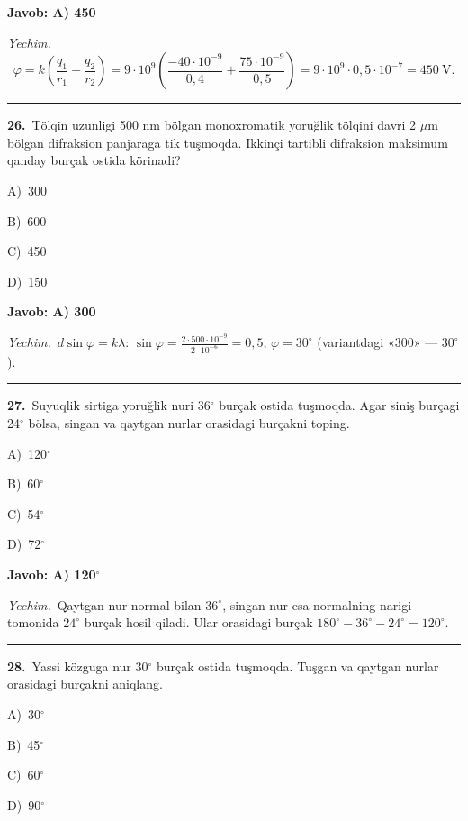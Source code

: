 \documentclass[11pt,a4paper]{article}
\newcommand{\opt}[2]{\hspace*{4mm}#1)\ #2\par}
\begin{document}
\noindent\colorbox{gray!12}{\parbox{\dimexpr\linewidth-2\fboxsep}{\textbf{Javob: A) 450}}}\par\smallskip
\noindent\textit{Yechim.}\ \[\varphi=k\left(\frac{q_1}{r_1}+\frac{q_2}{r_2}\right)=9\cdot10^9\left(\frac{-40\cdot10^{-9}}{0{,}4}+\frac{75\cdot10^{-9}}{0{,}5}\right)=9\cdot10^9\cdot0{,}5\cdot10^{-7}=450\ \text{V}.\]\par\medskip\hrule\medskip
{}\noindent\begin{minipage}{\linewidth}
\textbf{26.}\ Tölqin uzunligi 500 nm bölgan monoxromatik yoruğlik tölqini davri 2 $\mu$m bölgan difraksion panjaraga tik tuşmoqda. Ikkinçi tartibli difraksion maksimum qanday burçak ostida körinadi?\par\smallskip
\opt{A}{300}
\opt{B}{600}
\opt{C}{450}
\opt{D}{150}
\end{minipage}\vspace{2pt}\par
\noindent\colorbox{gray!12}{\parbox{\dimexpr\linewidth-2\fboxsep}{\textbf{Javob: A) 300}}}\par\smallskip
\noindent\textit{Yechim.}\ $d\sin\varphi=k\lambda$: $\sin\varphi=\frac{2\cdot500\cdot10^{-9}}{2\cdot10^{-6}}=0{,}5$, $\varphi=30^\circ$ (variantdagi «300» — $30^\circ$).\par\par\medskip\hrule\medskip
{}\noindent\begin{minipage}{\linewidth}
\textbf{27.}\ Suyuqlik sirtiga yoruğlik nuri 36$^\circ$ burçak ostida tuşmoqda. Agar siniş burçagi 24$^\circ$ bölsa, singan va qaytgan nurlar orasidagi burçakni toping.\par\smallskip
\opt{A}{120$^\circ$}
\opt{B}{60$^\circ$}
\opt{C}{54$^\circ$}
\opt{D}{72$^\circ$}
\end{minipage}\vspace{2pt}\par
\noindent\colorbox{gray!12}{\parbox{\dimexpr\linewidth-2\fboxsep}{\textbf{Javob: A) 120$^\circ$}}}\par\smallskip
\noindent\textit{Yechim.}\ Qaytgan nur normal bilan $36^\circ$, singan nur esa normalning narigi tomonida $24^\circ$ burçak hosil qiladi. Ular orasidagi burçak $180^\circ-36^\circ-24^\circ=120^\circ$.\par\par\medskip\hrule\medskip
{}\noindent\begin{minipage}{\linewidth}
\textbf{28.}\ Yassi közguga nur 30$^\circ$ burçak ostida tuşmoqda. Tuşgan va qaytgan nurlar orasidagi burçakni aniqlang.\par\smallskip
\opt{A}{30$^\circ$}
\opt{B}{45$^\circ$}
\opt{C}{60$^\circ$}
\opt{D}{90$^\circ$}
\end{minipage}\vspace{2pt}\par
\end{document}
